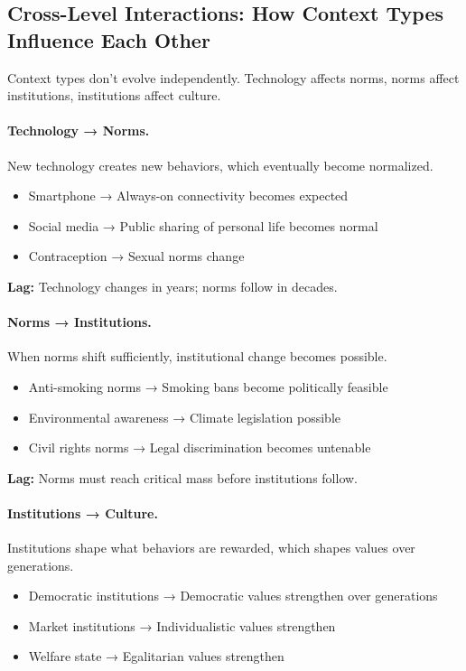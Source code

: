 \documentclass[12pt,a4paper]{article}
\begin{document}
\subsection{Cross-Level Interactions: How Context Types Influence Each Other}

Context types don't evolve independently. Technology affects norms,
norms affect institutions, institutions affect culture.

\paragraph{Technology → Norms.}
New technology creates new behaviors, which eventually become normalized.
\begin{itemize}
  \item Smartphone → Always-on connectivity becomes expected
  \item Social media → Public sharing of personal life becomes normal
  \item Contraception → Sexual norms change
\end{itemize}

\textbf{Lag:} Technology changes in years; norms follow in decades.

\paragraph{Norms → Institutions.}
When norms shift sufficiently, institutional change becomes possible.
\begin{itemize}
  \item Anti-smoking norms → Smoking bans become politically feasible
  \item Environmental awareness → Climate legislation possible
  \item Civil rights norms → Legal discrimination becomes untenable
\end{itemize}

\textbf{Lag:} Norms must reach critical mass before institutions follow.

\paragraph{Institutions → Culture.}
Institutions shape what behaviors are rewarded, which shapes values over generations.
\begin{itemize}
  \item Democratic institutions → Democratic values strengthen over generations
  \item Market institutions → Individualistic values strengthen
  \item Welfare state → Egalitarian values strengthen
\end{itemize}
\end{document}
